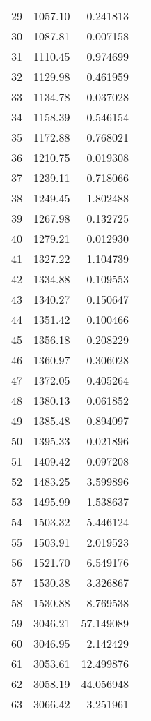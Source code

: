\begin{tabular}{r|rr|l}
29 &     1057.10 &   0.241813  & \\
30 &     1087.81 &   0.007158  & \\
31 &     1110.45 &   0.974699  & \\
32 &     1129.98 &   0.461959  & \\
33 &     1134.78 &   0.037028  & \\
34 &     1158.39 &   0.546154  & \\
35 &     1172.88 &   0.768021  & \\
36 &     1210.75 &   0.019308  & \\
37 &     1239.11 &   0.718066  & \\
38 &     1249.45 &   1.802488  & \\
39 &     1267.98 &   0.132725  & \\
40 &     1279.21 &   0.012930  & \\
41 &     1327.22 &   1.104739  & \\
42 &     1334.88 &   0.109553  & \\
43 &     1340.27 &   0.150647  & \\
44 &     1351.42 &   0.100466  & \\
45 &     1356.18 &   0.208229  & \\
46 &     1360.97 &   0.306028  & \\
47 &     1372.05 &   0.405264  & \\
48 &     1380.13 &   0.061852  & \\
49 &     1385.48 &   0.894097  & \\
50 &     1395.33 &   0.021896  & \\
51 &     1409.42 &   0.097208  & \\
52 &     1483.25 &   3.599896  & \\
53 &     1495.99 &   1.538637  & \\
54 &     1503.32 &   5.446124  & \\
55 &     1503.91 &   2.019523  & \\
56 &     1521.70 &   6.549176  & \\
57 &     1530.38 &   3.326867  & \\
58 &     1530.88 &   8.769538  & \\
59 &     3046.21 &  57.149089  & \\
60 &     3046.95 &   2.142429  & \\
61 &     3053.61 &  12.499876  & \\
62 &     3058.19 &  44.056948  & \\
63 &     3066.42 &   3.251961  & \\

\end{tabular}
